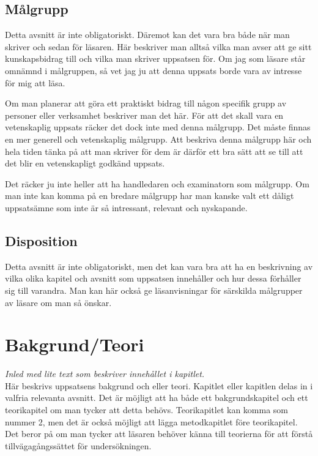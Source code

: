 \documentclass[a4paper,12pt]{article} %
\begin{document}
\subsection{ Målgrupp}
Detta avsnitt är inte obligatoriskt. Däremot kan det vara bra både när man skriver och sedan för läsaren. Här beskriver man alltså vilka man avser att ge sitt kunskapsbidrag till och vilka man skriver uppsatsen för. Om jag som läsare står omnämnd i målgruppen, så vet jag ju att denna uppsats borde vara av intresse för mig att läsa. 

Om man planerar att göra ett praktiskt bidrag till någon specifik grupp av personer eller verksamhet beskriver man det här. För att det skall vara en vetenskaplig uppsats räcker det dock inte med denna målgrupp. Det måste finnas en mer generell och vetenskaplig målgrupp. Att beskriva denna målgrupp här och hela tiden tänka på att man skriver för dem är därför ett bra sätt att se till att det blir en vetenskapligt godkänd uppsats. 

Det räcker ju inte heller att ha handledaren och examinatorn som målgrupp. Om man inte kan komma på en bredare målgrupp har man kanske valt ett dåligt uppsatsämne som inte är så intressant, relevant och nyskapande.

\subsection{Disposition}
Detta avsnitt är inte obligatoriskt, men det kan vara bra att ha en beskrivning av vilka olika kapitel och avsnitt som uppsatsen innehåller och hur dessa förhåller sig till varandra. Man kan här också ge läsanvisningar för särskilda målgrupper av läsare om man så önskar. 
\newpage

\section{Bakgrund/Teori}
\emph{Inled med lite text som beskriver inneh\aa llet i kapitlet.}\\
Här beskrivs uppsatsens bakgrund och eller teori. Kapitlet eller kapitlen delas in i valfria relevanta avsnitt. Det är möjligt att ha både ett bakgrundskapitel och ett teorikapitel om man tycker att detta behövs. Teorikapitlet kan komma som nummer 2, men det är också möjligt att lägga metodkapitlet före teorikapitel. Det beror på om man tycker att läsaren behöver känna till teorierna för att förstå tillvägagångssättet för undersökningen. 
\end{document}
